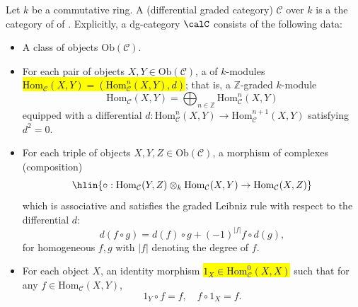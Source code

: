 \begin{definition}[dg-category] \label{definition:dg_category_over_a_ring}
Let $k$ be a commutative ring. A  (differential graded category) $\mathcal{C}$ over $k$ is a  the category of  of . Explicitly, a dg-category $\calC$ consists of the following data:
\begin{itemize}
    \item A class of objects $\mathrm{Ob}(\mathcal{C})$.
    \item For each pair of objects $X,Y \in \mathrm{Ob}(\mathcal{C})$, a  of $k$-modules \hl{$\mathrm{Hom}_\mathcal{C}(X,Y) = (\mathrm{Hom}^n_\mathcal{C}(X,Y), d)$}; that is, a $\mathbb{Z}$-graded $k$-module $$\mathrm{Hom}_\mathcal{C}(X,Y) = \bigoplus_{n \in \mathbb{Z}} \mathrm{Hom}_\mathcal{C}^n(X,Y)$$ equipped with a differential $d : \mathrm{Hom}_\mathcal{C}^n(X,Y) \to \mathrm{Hom}_\mathcal{C}^{n+1}(X,Y)$ satisfying $d^2 = 0$.
    \item For each triple of objects $X,Y,Z \in \mathrm{Ob}(\mathcal{C})$, a morphism of complexes (composition)
    $$\hlin{\circ : \mathrm{Hom}_\mathcal{C}(Y,Z) \otimes_k \mathrm{Hom}_\mathcal{C}(X,Y) \to \mathrm{Hom}_\mathcal{C}(X,Z)}$$
    which is associative and satisfies the graded Leibniz rule with respect to the differential $d$:
    $$d(f \circ g) = d(f) \circ g + (-1)^{|f|} f \circ d(g),$$
    for homogeneous $f,g$ with $|f|$ denoting the degree of $f$.
    \item For each object $X$, an identity morphism \hl{$1_X \in \mathrm{Hom}_\mathcal{C}^0(X,X)$} such that for any $f \in \mathrm{Hom}_\mathcal{C}(X,Y)$,
    $$1_Y \circ f = f, \quad f \circ 1_X = f.$$
\end{itemize}
\end{definition}